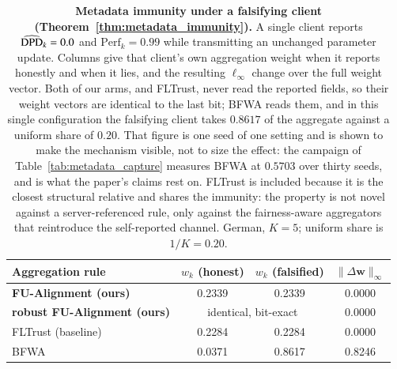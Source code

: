 \begin{table}[t]
\centering
\small
\caption{\textbf{Metadata immunity under a falsifying client (Theorem~\ref{thm:metadata_immunity}).}
A single client reports $\widehat{\mathrm{DPD}}_k = 0.0$ and $\mathrm{Perf}_k = 0.99$ while transmitting an
unchanged parameter update. Columns give that client's own aggregation weight when it reports
honestly and when it lies, and the resulting $\ell_\infty$ change over the full weight vector.
Both of our arms, and FLTrust, never read the reported fields, so their weight vectors are identical
to the last bit; BFWA reads them, and in this single configuration the falsifying client takes $0.8617$ of the aggregate against a uniform share of $0.20$. That figure is one seed of one setting and is shown to make the mechanism visible, not to size the effect: the campaign of Table~\ref{tab:metadata_capture} measures BFWA at $0.5703$ over thirty seeds, and is what the paper's claims rest on. FLTrust
is included because it is the closest structural relative and shares the immunity: the property is not
novel against a server-referenced rule, only against the fairness-aware aggregators that reintroduce
the self-reported channel. German, $K=5$; uniform share is $1/K = 0.20$.}
\label{tab:metadata_immunity}
\begin{tabular}{lccc}
\toprule
\textbf{Aggregation rule} & \textbf{$w_k$ (honest)} & \textbf{$w_k$ (falsified)} & \textbf{$\lVert \Delta \bm{w}\rVert_\infty$} \\
\midrule
\textbf{FU-Alignment (ours)} & 0.2339 & 0.2339 & 0.0000 \\
\textbf{robust FU-Alignment (ours)} & \multicolumn{2}{c}{identical, bit-exact} & 0.0000 \\
FLTrust (baseline) & 0.2284 & 0.2284 & 0.0000 \\
BFWA~\cite{dang2026fedfairgnn} & 0.0371 & 0.8617 & 0.8246 \\
\bottomrule
\end{tabular}
\end{table}
